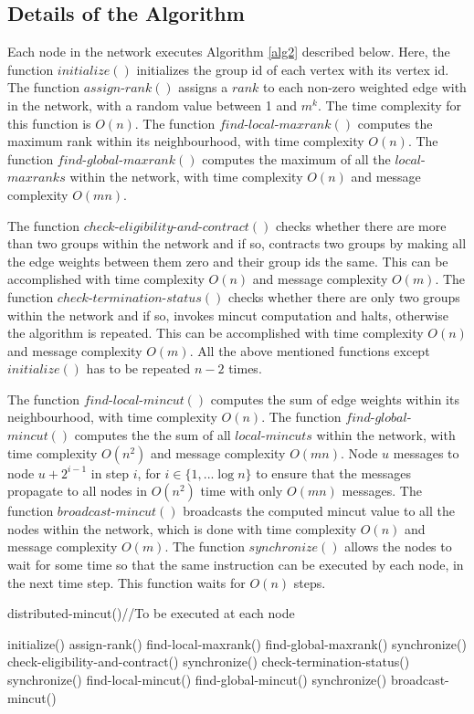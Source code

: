 \documentclass{acm_proc_article-sp}
\begin{document}
\subsection{Details of the Algorithm}

Each node in the network executes Algorithm \ref{alg2} described below. Here, the function $initialize()$ initializes the group id of each vertex with its vertex id. The function $assign$-$rank()$ assigns a $rank$ to each non-zero weighted edge with in the network, with a random value between 1 and $m^{k}$. The time complexity for this function is $O(n)$. The function $find$-$local$-$maxrank()$ computes the maximum rank within its neighbourhood, with time complexity $O(n)$. The function $find$-$global$-$maxrank()$ computes the maximum of all the $local$-$maxranks$ within the network, with time complexity $O(n)$ and message complexity $O(mn)$.

The function $check$-$eligibility$-$and$-$contract()$ checks whether there are more than two groups within the network and if so, contracts two groups by making all the edge weights between them zero and their group ids the same. This can be accomplished with time complexity $O(n)$ and message complexity $O(m)$. The function $check$-$termination$-$status()$ checks whether there are only two groups within the network and if so, invokes mincut computation and halts, otherwise the algorithm is repeated. This can be accomplished with time complexity $O(n)$ and message complexity $O(m)$. All the above mentioned functions except $initialize()$ has to be repeated $n-2$ times.

The function $find$-$local$-$mincut()$ computes the sum of edge weights within its neighbourhood, with time complexity $O(n)$. The function $find$-$global$-$mincut()$ computes the the sum of all $local$-$mincuts$ within the network, with time complexity $O(n^{2})$ and message complexity $O(mn)$.  Node $u$ messages to node $u+2^{i-1}$ in step $i$, for $i\in \{1,...\log{n}\}$ to ensure that the messages propagate to all nodes in $O(n^{2})$ time with only $O(mn)$ messages. The function $broadcast$-$mincut()$ broadcasts the computed mincut value to all the nodes within the network, which is done with time complexity $O(n)$ and message complexity $O(m)$. The function $synchronize()$ allows the nodes to wait for some time so that the same instruction can be executed by each node, in the next time step. This function waits for $O(n)$ steps.

\begin{algorithm}                      \caption{distributed-mincut()\;\;\;\;\;//To be executed at each node}   \label{alg2}                           \begin{algorithmic}
\STATE initialize()
\REPEAT
\STATE assign-rank()
\STATE find-local-maxrank()
\STATE find-global-maxrank()
\STATE synchronize()
\STATE check-eligibility-and-contract()
\STATE synchronize()
\STATE check-termination-status()
\STATE synchronize()
\STATE find-local-mincut()
\STATE find-global-mincut()
\STATE synchronize()
\STATE broadcast-mincut()
\end{algorithmic}
\end{algorithm}
\end{document}
